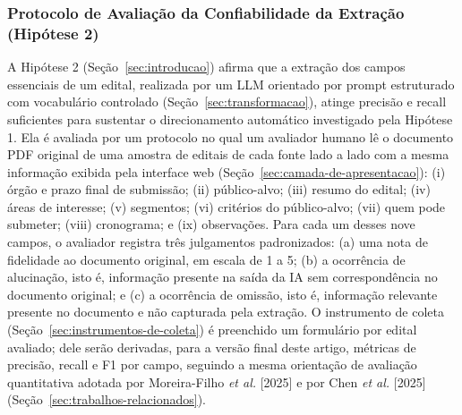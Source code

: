 \documentclass[12pt]{article}
\begin{document}
  \subsubsection{Protocolo de Avaliação da Confiabilidade da Extração (Hipótese 2)}\label{sec:protocolo-de-avaliacao-da-confiabilidade-da-extracao-hipotese-2}
  A Hipótese 2 (Seção~\ref{sec:introducao}) afirma que a extração dos campos essenciais de um edital, realizada por um LLM orientado por prompt estruturado com vocabulário controlado (Seção~\ref{sec:transformacao}), atinge precisão e recall suficientes para sustentar o direcionamento automático investigado pela Hipótese 1. Ela é avaliada por um protocolo no qual um avaliador humano lê o documento PDF original de uma amostra de editais de cada fonte lado a lado com a mesma informação exibida pela interface web (Seção~\ref{sec:camada-de-apresentacao}): (i) órgão e prazo final de submissão; (ii) público-alvo; (iii) resumo do edital; (iv) áreas de interesse; (v) segmentos; (vi) critérios do público-alvo; (vii) quem pode submeter; (viii) cronograma; e (ix) observações. Para cada um desses nove campos, o avaliador registra três julgamentos padronizados: (a) uma nota de fidelidade ao documento original, em escala de 1 a 5; (b) a ocorrência de alucinação, isto é, informação presente na saída da IA sem correspondência no documento original; e (c) a ocorrência de omissão, isto é, informação relevante presente no documento e não capturada pela extração. O instrumento de coleta (Seção~\ref{sec:instrumentos-de-coleta}) é preenchido um formulário por edital avaliado; dele serão derivadas, para a versão final deste artigo, métricas de precisão, recall e F1 por campo, seguindo a mesma orientação de avaliação quantitativa adotada por Moreira-Filho \emph{et al.} [2025] e por Chen \emph{et al.} [2025] (Seção~\ref{sec:trabalhos-relacionados}).
\end{document}
